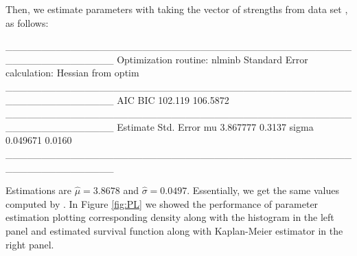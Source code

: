 \documentclass[nojss]{jss}
\begin{document}
Then, we estimate parameters with  taking the vector of strengths from data set , as follows:

\begin{Schunk}
\begin{Soutput}
_______________________________________________________________
Optimization routine: nlminb 
Standard Error calculation: Hessian from optim 
_______________________________________________________________
      AIC      BIC
  102.119 106.5872
_______________________________________________________________
      Estimate  Std. Error
mu     3.867777     0.3137
sigma  0.049671     0.0160
_______________________________________________________________
\end{Soutput}
\end{Schunk}

Estimations are $\hat{\mu}=3.8678$ and $\hat{\sigma}=0.0497$. Essentially, we get the same values computed by \cite{Ghitany2013}. In Figure \ref{fig:PL} we showed the performance of parameter estimation plotting corresponding density along with the histogram in the left panel and estimated survival function along with Kaplan-Meier estimator in the right panel.
\end{document}
